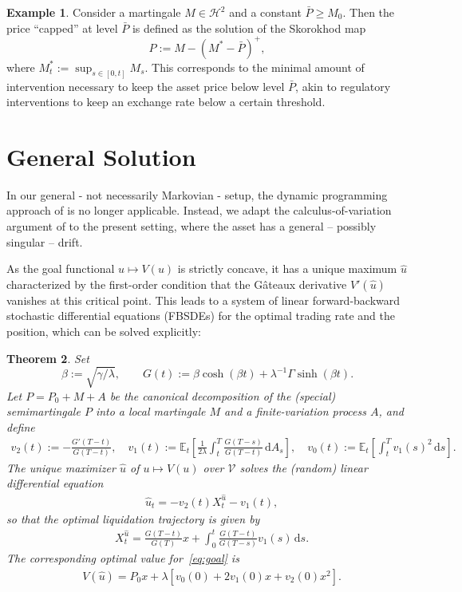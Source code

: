 \documentclass[11pt]{article}
\numberwithin{equation}{section}
\newtheorem{thm}{Theorem}[section]
\theoremstyle{definition}
\newtheorem{eg}[thm]{Example}
\theoremstyle{remark}
\newcommand{\E}{\mathbb{E}} %
\newcommand{\ts}{\textstyle}
\newcommand{\de}{\,\mathrm{d}}
\begin{document}
\begin{eg}\label{ex:target}
Consider a martingale $M\in\mathcal{H}^2$ and a constant $\bar{P} \geq M_0$. Then the price ``capped'' at level $\bar{P}$ is defined as the solution of the Skorokhod map 
$$P:=M-(M^*-\bar{P})^+,$$
where $M^*_t:=\sup_{s\in[0,t]} M_s$. This corresponds to the minimal amount of intervention necessary to keep the asset price below level $\bar{P}$, akin to regulatory interventions to keep an exchange rate below a certain threshold.
\end{eg}


\section{General Solution}\label{s:result}

In our general - not necessarily Markovian - setup, the dynamic programming approach of \cite{lehalle2017incorporating} is no longer applicable. Instead, we adapt the calculus-of-variation argument of \cite{bank2017hedging,bouchard2017equilibrium} to the present setting, where the asset has a general -- possibly singular -- drift. 

As the goal functional $u\mapsto V(u)$ is strictly concave, it has a unique maximum $\hat{u}$ characterized by the first-order condition that the G\^ateaux derivative $V'(\hat{u})$ vanishes at this critical point. This leads to a system of linear forward-backward stochastic differential equations (FBSDEs) for the optimal trading rate and the position, which can be solved explicitly:

\begin{thm}\label{main}
Set 
$$\beta:=\sqrt{\gamma/\lambda}, \qquad G(t):= \beta\cosh(\beta t)+\lambda^{-1}\Gamma\sinh(\beta t).
$$
Let $P=P_0+M+A$ be the canonical decomposition of the (special) semimartingale $P$ into a local martingale $M$ and a finite-variation process $A$, and define 
\begin{align*}
v_2(t):= 
-\frac{G'(T-t)}{G(T-t)}, \quad
v_1(t):= \E_t\left[ \frac{1}{2\lambda}\int_t^T \frac{G(T-s)}{G(T-t)} \de A_s \right], \quad
v_0(t):= \E_t\left[ \int_t^T v_1(s)^2 \de s \right].
\end{align*}
The unique maximizer $\hat{u}$ of $u\mapsto V(u)$ over $\mathcal V$ solves the (random) linear differential equation
\begin{align}\label{eq:ODE}
&\hat{u}_t = -v_2(t) X^{\hat{u}}_t - v_1(t),
\end{align}
so that the optimal liquidation trajectory is given by
\begin{align}\label{eq:Pos}
&X^{\hat{u}}_t = \frac{G(T-t)}{G(T)}x + \int_0^t \frac{G(T-t)}{G(T-s)} v_1(s) \de s.
\end{align}
The corresponding optimal value for~\eqref{eq:goal} is
\begin{align}\label{eq:vf}
&\ts V(\hat{u}) = P_0 x + \lambda\left[v_0(0) + 2 v_1(0) x + v_2(0) x^2\right].
\end{align}
\end{thm}
\end{document}
